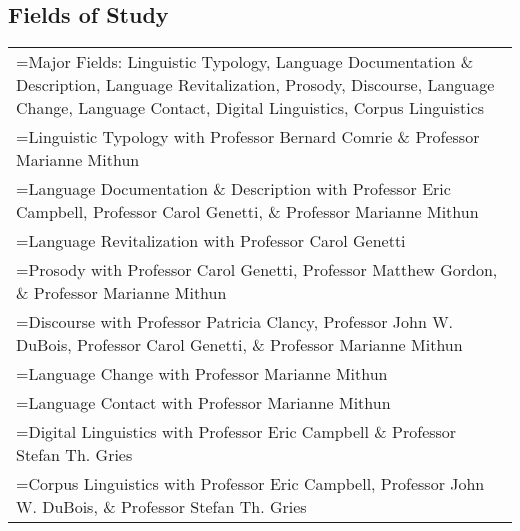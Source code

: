 \subsection*{Fields of Study}

\begin{longtabu} to 

  Major Fields: Linguistic Typology, Language Documentation \& Description, Language Revitalization, Prosody, Discourse, Language Change, Language Contact, Digital Linguistics, Corpus Linguistics\\

  Linguistic Typology with Professor Bernard Comrie \& Professor Marianne Mithun\\

  Language Documentation \& Description with Professor Eric Campbell, Professor Carol Genetti, \& Professor Marianne Mithun\\

  Language Revitalization with Professor Carol Genetti\\

  Prosody with Professor Carol Genetti, Professor Matthew Gordon, \& Professor Marianne Mithun\\

  Discourse with Professor Patricia Clancy, Professor John W. DuBois, Professor Carol Genetti, \& Professor Marianne Mithun\\

  Language Change with Professor Marianne Mithun\\

  Language Contact with Professor Marianne Mithun\\

  Digital Linguistics with Professor Eric Campbell \& Professor Stefan Th. Gries\\

  Corpus Linguistics with Professor Eric Campbell, Professor John W. DuBois, \& Professor Stefan Th. Gries

\end{longtabu}

\doublespacing
